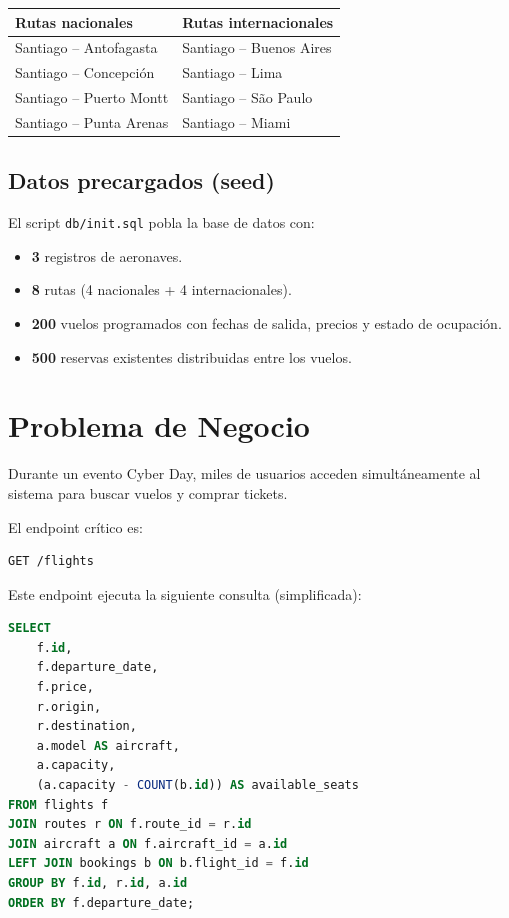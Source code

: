 \documentclass[12pt,a4paper]{article}
\begin{document}
\begin{center}
\begin{tabular}{|l|l|}
\hline
\textbf{Rutas nacionales} & \textbf{Rutas internacionales} \\
\hline
Santiago -- Antofagasta  & Santiago -- Buenos Aires \\
Santiago -- Concepción   & Santiago -- Lima \\
Santiago -- Puerto Montt & Santiago -- São Paulo \\
Santiago -- Punta Arenas & Santiago -- Miami \\
\hline
\end{tabular}
\end{center}

\subsection{Datos precargados (seed)}

El script \texttt{db/init.sql} pobla la base de datos con:

\begin{itemize}
  \item \textbf{3} registros de aeronaves.
  \item \textbf{8} rutas (4 nacionales + 4 internacionales).
  \item \textbf{200} vuelos programados con fechas de salida, precios y estado de ocupación.
  \item \textbf{500} reservas existentes distribuidas entre los vuelos.
\end{itemize}

\section{Problema de Negocio}

Durante un evento Cyber Day, miles de usuarios acceden simultáneamente al sistema para buscar vuelos y comprar tickets.

El endpoint crítico es:

\begin{lstlisting}[language=bash]
GET /flights
\end{lstlisting}

Este endpoint ejecuta la siguiente consulta (simplificada):

\begin{lstlisting}[language=sql, caption={Consulta del endpoint /flights (versión base)}]
SELECT
    f.id,
    f.departure_date,
    f.price,
    r.origin,
    r.destination,
    a.model AS aircraft,
    a.capacity,
    (a.capacity - COUNT(b.id)) AS available_seats
FROM flights f
JOIN routes r ON f.route_id = r.id
JOIN aircraft a ON f.aircraft_id = a.id
LEFT JOIN bookings b ON b.flight_id = f.id
GROUP BY f.id, r.id, a.id
ORDER BY f.departure_date;
\end{lstlisting}
\end{document}
